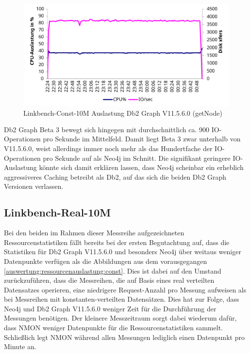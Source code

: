 \begin{figure}[!ht]
    \centering
    \includegraphics[width=\textwidth]{images/stats/linkbench-10m-const_ga.pdf}
    \caption{Linkbench-Const-10M Auslastung Db2 Graph V11.5.6.0 (getNode)}
    \label{fig:nmon:10m:const:ga}
\end{figure}

Db2 Graph Beta 3 bewegt sich hingegen mit durchschnittlich ca. 900 IO-Ope\-ra\-ti\-on\-en pro Sekunde im Mittelfeld. Damit liegt Beta 3 zwar unterhalb von V11.5.6.0, weist allerdings immer noch mehr als das Hundertfache der IO-Ope\-ra\-ti\-on\-en pro Sekunde auf als Neo4j im Schnitt. Die signifikant geringere IO-Aus\-last\-ung könnte sich damit erklären lassen, dass Neo4j scheinbar ein erheblich aggressiveres Caching betreibt als Db2, auf das sich die beiden Db2 Graph Versionen verlassen. 

\subsection{Linkbench-Real-10M}
\label{auswertung:ressourcenauslastung:real}
Bei den beiden im Rahmen dieser Messreihe aufgezeichneten Ressourcenstatistiken fällt bereits bei der ersten Begutachtung auf, dass die Statistiken für Db2 Graph V11.5.6.0 und besonders Neo4j über weitaus weniger Datenpunkte verfügen als die Abbildungen aus dem vorausgegangen \autoref{auswertung:ressourcenauslastung:const}. Dies ist dabei auf den Umstand zurückzuführen, dass die Messreihen, die auf Basis eines real verteilten Datensatzes operieren, eine niedrigere Request-Anzahl pro Messung aufweisen als bei Messreihen mit konstanten-verteilten Datensätzen. Dies hat zur Folge, dass Neo4j und Db2 Graph V11.5.6.0 weniger Zeit für die Durchführung der Messungen benötigen. Der kleinere Messzeitraum sorgt dabei wiederum dafür, dass NMON weniger Datenpunkte für die Ressourcenstatistiken sammelt. Schließlich legt NMON während allen Messungen lediglich einen Datenpunkt pro Minute an. 

